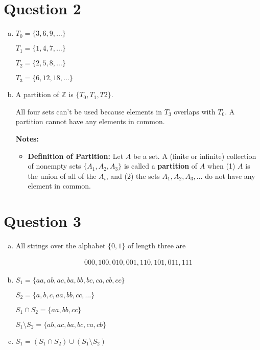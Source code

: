 \documentclass[12pt]{article}
\begin{document}
\section*{Question 2}
\begin{enumerate}[a.]
    \item

    $T_0 = \{3,6,9,\dots\}$

    $T_1 = \{1,4,7,\dots\}$

    $T_2 = \{2,5,8,\dots\}$

    $T_3 = \{6,12,18,\dots\}$

    \item

    A partition of $\mathbb{Z}$ is $\{T_0,T_1,T2\}$.

    \bigskip

    All four sets can't be used because elements in $T_3$ overlaps with $T_0$.
    A partition cannot have any elements in common.

    \bigskip

    \textbf{Notes:}

    \begin{itemize}
        \item \textbf{Definition of Partition:} Let $A$ be a set. A (finite or
        infinite) collection of nonempty sets $\{A_1,A_2,A_3\}$ is called a
        \textbf{partition} of $A$ when (1) $A$ is the union of all of the $A_i$,
        and (2) the sets $A_1,A_2,A_3,\dots$ do not have any element in common.

    \end{itemize}

\end{enumerate}


\section*{Question 3}
\begin{enumerate}[a.]
    \item

    All strings over the alphabet $\{0,1\}$ of length three are

    \begin{align*}
        000,100,010,001,110,101,011,111
    \end{align*}

    \item

    $S_1 = \{aa,ab,ac,ba,bb,bc,ca,cb,cc\}$

    $S_2 = \{a,b,c,aa,bb,cc,\dots\}$

    $S_1 \cap S_2 = \{aa,bb,cc\}$

    $S_1 \setminus S_2 = \{ab,ac,ba,bc,ca,cb\}$

    \item

    $S_1 = (S_1 \cap S_2) \cup (S_1 \setminus S_2)$

\end{enumerate}
\end{document}
